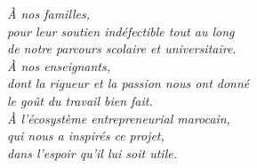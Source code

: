 \thispagestyle{plain}
\begin{center}
\vspace*{2cm}

\textit{\Large À nos familles,}\\[0.6cm]

\textit{\large pour leur soutien indéfectible tout au long\\
de notre parcours scolaire et universitaire.}\\[1.2cm]

\textit{\Large À nos enseignants,}\\[0.6cm]

\textit{\large dont la rigueur et la passion nous ont donné\\
le goût du travail bien fait.}\\[1.2cm]

\textit{\Large À l'écosystème entrepreneurial marocain,}\\[0.6cm]

\textit{\large qui nous a inspirés ce projet,\\
dans l'espoir qu'il lui soit utile.}

\vfill
\end{center}
